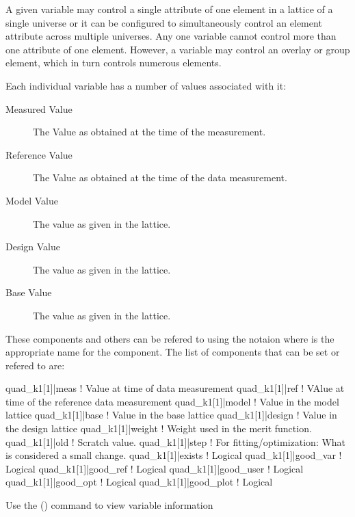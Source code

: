 A given variable may control a single attribute of one element in a
 lattice of a single universe or it can be configured to
simultaneously control an element attribute across multiple
universes. Any one variable cannot control more than one attribute of
one element. However, a variable may control an overlay or group
element, which in turn controls numerous elements.

Each individual variable has a number of values associated with it:
  \vspace*{-3ex}
  \begin{description}
  \item[Measured Value] \Newline
The Value as obtained at the time of the  measurement.
  \item[Reference Value] \Newline
The Value as obtained at the time of the  data  measurement.
  \item[Model Value] \Newline
The value as given in the  lattice.
  \item[Design Value] \Newline
The value as given in the  lattice.
  \item[Base Value] \Newline
The value as given in the  lattice.
  \end{description}
These components and others can be refered to using the notaion  where
 is the appropriate name for the component. The list of
components that can be set or refered to are:
\begin{example}
  quad_k1[1]|meas      ! Value at time of data measurement
  quad_k1[1]|ref       ! VAlue at time of the reference data measurement
  quad_k1[1]|model     ! Value in the model lattice
  quad_k1[1]|base      ! Value in the base lattice
  quad_k1[1]|design    ! Value in  the design lattice
  quad_k1[1]|weight    ! Weight used in the merit function.
  quad_k1[1]|old       ! Scratch value.
  quad_k1[1]|step      ! For fitting/optimization: What is considered a small change.
  quad_k1[1]|exists    ! Logical
  quad_k1[1]|good_var  ! Logical
  quad_k1[1]|good_ref  ! Logical
  quad_k1[1]|good_user ! Logical
  quad_k1[1]|good_opt  ! Logical
  quad_k1[1]|good_plot ! Logical
\end{example}

Use the  () command to view variable information

